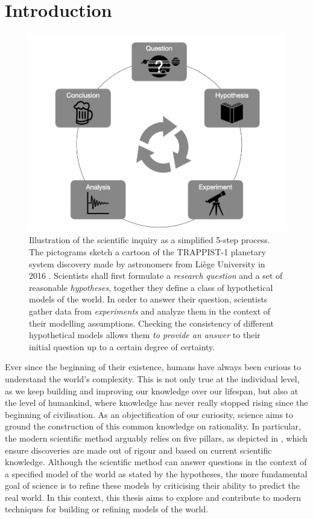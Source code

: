 \chapter{Introduction}\label{ch:introduction}
\begin{figure}[!h]
  \centering
  \includegraphics[width=.75\textwidth]{figures/chapter01/trapist_disco.png}
  \caption{
  Illustration of the scientific inquiry as a simplified 5-step process. The pictograms sketch a cartoon of the TRAPPIST-1 planetary system discovery made by astronomers from Li{\`e}ge University in 2016 \citep{gillon2017seven}. Scientists shall first formulate a \textit{research question} and a set of reasonable \textit{hypotheses}, together they define a class of hypothetical models of the world. In order to answer their question, scientists gather data from \textit{experiments} and analyze them in the context of their modelling assumptions. Checking the consistency of different hypothetical models allows them \textit{to provide an answer} to their initial question up to a certain degree of certainty.}
  \label{fig:ch01:scientific_method}
\end{figure}

Ever since the beginning of their existence, humans have always been curious to understand the world's complexity. This is not only true at the individual level, as we keep building and improving our knowledge over our lifespan, but also at the level of humankind, where knowledge has never really stopped rising since the beginning of civilisation. As an objectification of our curiosity, science aims to ground the construction of this common knowledge on rationality. In particular, the modern scientific method arguably relies on five pillars, as depicted in , which ensure discoveries are made out of rigour and based on current scientific knowledge. Although the scientific method can answer questions in the context of a specified model of the world as stated by the hypotheses, the more fundamental goal of science is to refine these models by criticising their ability to predict the real world. In this context, this thesis aims to explore and contribute to modern techniques for building or refining models of the world.

